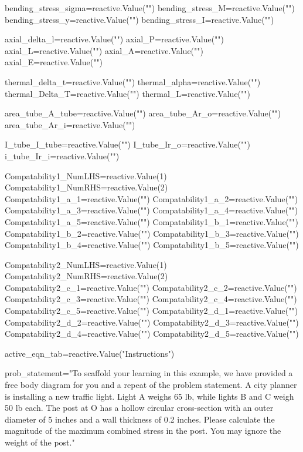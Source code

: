 \documentclass[
  letterpaper,
  DIV=11,
  numbers=noendperiod]{scrreprt}
\newenvironment{Shaded}{\begin{snugshade}}{\end{snugshade}}
\newcommand{\NormalTok}[1]{\textcolor[rgb]{0.00,0.23,0.31}{#1}}
\begin{document}
\begin{Shaded}
\begin{Highlighting}[]
\NormalTok{bending\_stress\_sigma=reactive.Value("")}
\NormalTok{bending\_stress\_M=reactive.Value("")}
\NormalTok{bending\_stress\_y=reactive.Value("")}
\NormalTok{bending\_stress\_I=reactive.Value("")}

\NormalTok{axial\_delta\_l=reactive.Value("")}
\NormalTok{axial\_P=reactive.Value("")}
\NormalTok{axial\_L=reactive.Value("")}
\NormalTok{axial\_A=reactive.Value("")}
\NormalTok{axial\_E=reactive.Value("")}

\NormalTok{thermal\_delta\_t=reactive.Value("")}
\NormalTok{thermal\_alpha=reactive.Value("")}
\NormalTok{thermal\_Delta\_T=reactive.Value("")}
\NormalTok{thermal\_L=reactive.Value("")}

\NormalTok{area\_tube\_A\_tube=reactive.Value("")}
\NormalTok{area\_tube\_Ar\_o=reactive.Value("")}
\NormalTok{area\_tube\_Ar\_i=reactive.Value("")}

\NormalTok{I\_tube\_I\_tube=reactive.Value("")}
\NormalTok{I\_tube\_Ir\_o=reactive.Value("")}
\NormalTok{i\_tube\_Ir\_i=reactive.Value("")}

\NormalTok{Compatability1\_NumLHS=reactive.Value(1)}
\NormalTok{Compatability1\_NumRHS=reactive.Value(2)}
\NormalTok{Compatability1\_a\_1=reactive.Value("")}
\NormalTok{Compatability1\_a\_2=reactive.Value("")}
\NormalTok{Compatability1\_a\_3=reactive.Value("")}
\NormalTok{Compatability1\_a\_4=reactive.Value("")}
\NormalTok{Compatability1\_a\_5=reactive.Value("")}
\NormalTok{Compatability1\_b\_1=reactive.Value("")}
\NormalTok{Compatability1\_b\_2=reactive.Value("")}
\NormalTok{Compatability1\_b\_3=reactive.Value("")}
\NormalTok{Compatability1\_b\_4=reactive.Value("")}
\NormalTok{Compatability1\_b\_5=reactive.Value("")}

\NormalTok{Compatability2\_NumLHS=reactive.Value(1)}
\NormalTok{Compatability2\_NumRHS=reactive.Value(2)}
\NormalTok{Compatability2\_c\_1=reactive.Value("")}
\NormalTok{Compatability2\_c\_2=reactive.Value("")}
\NormalTok{Compatability2\_c\_3=reactive.Value("")}
\NormalTok{Compatability2\_c\_4=reactive.Value("")}
\NormalTok{Compatability2\_c\_5=reactive.Value("")}
\NormalTok{Compatability2\_d\_1=reactive.Value("")}
\NormalTok{Compatability2\_d\_2=reactive.Value("")}
\NormalTok{Compatability2\_d\_3=reactive.Value("")}
\NormalTok{Compatability2\_d\_4=reactive.Value("")}
\NormalTok{Compatability2\_d\_5=reactive.Value("")}

\NormalTok{active\_eqn\_tab=reactive.Value("Instructions")}

\NormalTok{prob\_statement="To scaffold your learning in this example, we have provided a free body diagram for you and a repeat of the problem statement. A city planner is installing a new traffic light. Light A weighs 65 lb, while lights B and C weigh 50 lb each. The post at O has a hollow circular cross{-}section with an outer diameter of 5 inches and a wall thickness of 0.2 inches. Please calculate the magnitude of the maximum combined stress in the post. You may ignore the weight of the post."}


\end{Highlighting}
\end{Shaded}
\end{document}
